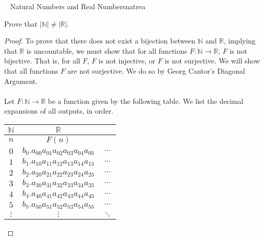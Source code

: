         \begin{example}{\Difficulty\,\Difficulty\,\Difficulty\,\Difficulty\,\,Natural Numbers and Real Numbers}{natrea}
        
            Prove that \(|\mathbb{N}|\neq|\mathbb{R}|\).
            \begin{proof}
                To prove that there does not exist a bijection between \(\mathbb{N}\) and \(\mathbb{R}\), implying that \(\mathbb{R}\) is uncountable, we must show that for all functions \(F:\mathbb{N}\to\mathbb{R}\), \(F\) is not bijective. That is, for all \(F\), \(F\) is not injective, or \(F\) is not surjective. We will show that all functions \(F\) are not surjective. We do so by Georg Cantor's Diagonal Argument.
                \\
                \\
                Let \(F:\mathbb{N}\to\mathbb{R}\) be a function given by the following table. We list the decimal expansions of all outputs, in order.
                \begin{center}
                    \begin{tabular}{c|cc}
                        \hline
                        \(\mathbb{N}\) & \(\mathbb{R}\) \\
                        \hline
                        \(n\) & \(F(n)\) \\
                        \hline
                        \(0\) & \(b_0.\boxed{a_{00}}a_{01}a_{02}a_{03}a_{04}a_{05}\) & \(\cdots\) \\
                        \(1\) & \(b_1.a_{10}\boxed{a_{11}}a_{12}a_{13}a_{14}a_{15}\) & \(\cdots\) \\
                        \(2\) & \(b_2.a_{20}a_{21}\boxed{a_{22}}a_{23}a_{24}a_{25}\) & \(\cdots\) \\
                        \(3\) & \(b_3.a_{30}a_{31}a_{32}\boxed{a_{33}}a_{34}a_{35}\) & \(\cdots\) \\
                        \(4\) & \(b_4.a_{40}a_{41}a_{42}a_{43}\boxed{a_{44}}a_{45}\) & \(\cdots\) \\
                        \(5\) & \(b_5.a_{50}a_{51}a_{52}a_{53}a_{54}\boxed{a_{55}}\) & \(\cdots\) \\
                        \(\vdots\) & \(\vdots\) & \(\ddots\) \\
                        \hline
                    \end{tabular}
                \end{center}
                \vphantom

\end{proof}
\end{example}
